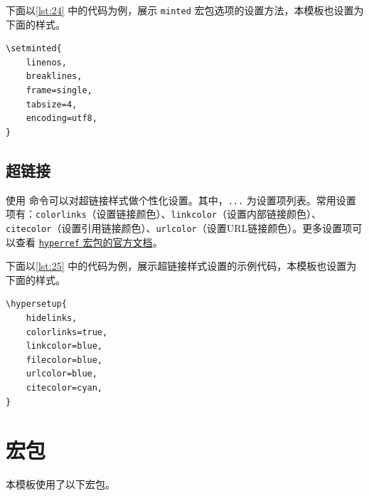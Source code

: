 \documentclass[a4paper]{article}
\begin{document}
下面以\cref{lst:24} 中的代码为例，展示 \texttt{minted} 宏包选项的设置方法，本模板也设置为下面的样式。

\begin{center}
    \label{lst:24}
    \begin{verbatim}
\setminted{
    linenos,
    breaklines,
	frame=single,
	tabsize=4,
	encoding=utf8,
}
    \end{verbatim}
\end{center}

\subsection{超链接}

使用 \texttt{\hypersetup{...}} 命令可以对超链接样式做个性化设置。其中，\texttt{...} 为设置项列表。常用设置项有：\texttt{colorlinks}（设置链接颜色）、\texttt{linkcolor}（设置内部链接颜色）、\texttt{citecolor}（设置引用链接颜色）、\texttt{urlcolor}（设置URL链接颜色）。更多设置项可以查看 \href{https://mirror.math.princeton.edu/pub/CTAN/macros/latex/contrib/hyperref/doc/hyperref-doc.pdf}{\texttt{hyperref} 宏包的官方文档}。

下面以\cref{lst:25} 中的代码为例，展示超链接样式设置的示例代码，本模板也设置为下面的样式。

\begin{center}
    \label{lst:25}
    \begin{verbatim}
\hypersetup{
    hidelinks,
    colorlinks=true,
    linkcolor=blue,
    filecolor=blue,      
    urlcolor=blue,
    citecolor=cyan,
}
    \end{verbatim}
\end{center}

\section{宏包}

本模板使用了以下宏包。
\end{document}
